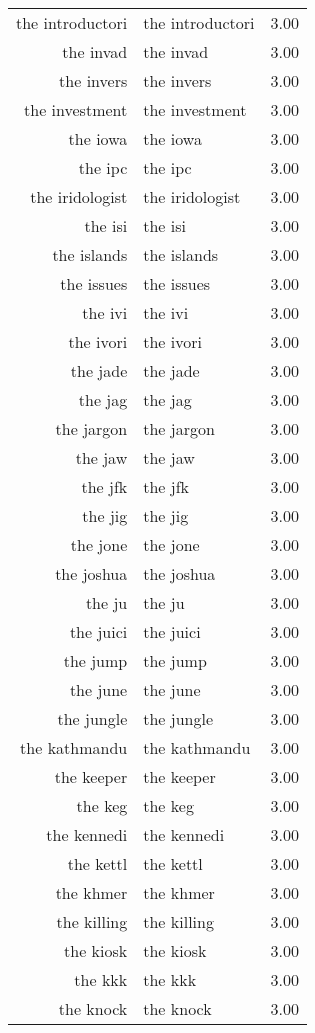 \begin{table}[ht]
\begin{tabular}{rlr}
  the introductori & the introductori & 3.00 \\ 
  the invad & the invad & 3.00 \\ 
  the invers & the invers & 3.00 \\ 
  the investment & the investment & 3.00 \\ 
  the iowa & the iowa & 3.00 \\ 
  the ipc & the ipc & 3.00 \\ 
  the iridologist & the iridologist & 3.00 \\ 
  the isi & the isi & 3.00 \\ 
  the islands & the islands & 3.00 \\ 
  the issues & the issues & 3.00 \\ 
  the ivi & the ivi & 3.00 \\ 
  the ivori & the ivori & 3.00 \\ 
  the jade & the jade & 3.00 \\ 
  the jag & the jag & 3.00 \\ 
  the jargon & the jargon & 3.00 \\ 
  the jaw & the jaw & 3.00 \\ 
  the jfk & the jfk & 3.00 \\ 
  the jig & the jig & 3.00 \\ 
  the jone & the jone & 3.00 \\ 
  the joshua & the joshua & 3.00 \\ 
  the ju & the ju & 3.00 \\ 
  the juici & the juici & 3.00 \\ 
  the jump & the jump & 3.00 \\ 
  the june & the june & 3.00 \\ 
  the jungle & the jungle & 3.00 \\ 
  the kathmandu & the kathmandu & 3.00 \\ 
  the keeper & the keeper & 3.00 \\ 
  the keg & the keg & 3.00 \\ 
  the kennedi & the kennedi & 3.00 \\ 
  the kettl & the kettl & 3.00 \\ 
  the khmer & the khmer & 3.00 \\ 
  the killing & the killing & 3.00 \\ 
  the kiosk & the kiosk & 3.00 \\ 
  the kkk & the kkk & 3.00 \\ 
  the knock & the knock & 3.00 \\ 

\end{tabular}
\end{table}
